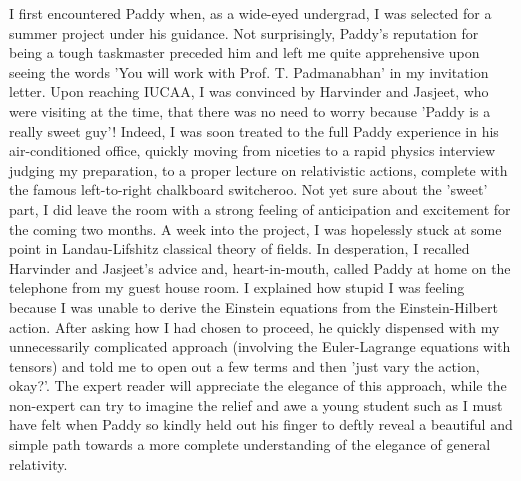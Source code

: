 \documentclass[prd, preprint, longbibliography, 12pt]{revtex4-2}
\begin{document}
I first encountered Paddy when, as a wide-eyed undergrad, I was selected for a summer project under his guidance. Not surprisingly, Paddy's reputation for being a tough taskmaster preceded him and left me quite apprehensive upon seeing the words 'You will work with Prof. T. Padmanabhan' in my invitation letter. Upon reaching IUCAA, I was convinced by Harvinder and Jasjeet, who were visiting at the time, that there was no need to worry because 'Paddy is a really sweet guy'! Indeed, I was soon treated to the full Paddy experience in his air-conditioned office, quickly moving from niceties to a rapid physics interview judging my preparation, to a proper lecture on relativistic actions, complete with the famous left-to-right chalkboard switcheroo. Not yet sure about the 'sweet' part, I did leave the room with a strong feeling of anticipation and excitement for the coming two months. A week into the project, I was hopelessly stuck at some point in Landau-Lifshitz classical theory of fields. In desperation, I recalled Harvinder and Jasjeet's advice and, heart-in-mouth, called Paddy at home on the telephone from my guest house room. I explained how stupid I was feeling because I was unable to derive the Einstein equations from the Einstein-Hilbert action. After asking how I had chosen to proceed, he quickly dispensed with my unnecessarily complicated approach (involving the Euler-Lagrange equations with tensors) and told me to open out a few terms and then 'just vary the action, okay?'. The expert reader will appreciate the elegance of this approach, while the non-expert can try to imagine the relief and awe a young student such as I must have felt when Paddy so kindly held out his finger to deftly reveal a beautiful and simple path towards a more complete understanding of the elegance of general relativity.
\end{document}
